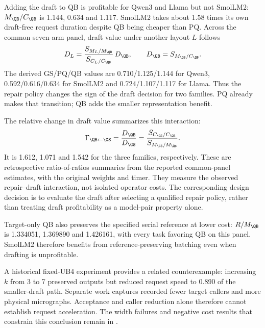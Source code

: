Adding the draft to QB is profitable for Qwen3 and Llama but not SmolLM2: $M_{\QB}/C_{\QB}$ is 1.144, 0.634 and 1.117. SmolLM2 takes about 1.58 times its own draft-free request duration despite QB being cheaper than PQ. Across the common seven-arm panel, draft value under another layout $L$ follows
\begin{equation}
D_L=\frac{S_{M_L/M_{\QB}}}{S_{C_L/C_{\QB}}}\,D_{\QB},\qquad D_{\QB}=S_{M_{\QB}/C_{\QB}}.
\label{eq:draft}
\end{equation}
The derived GS/PQ/QB values are 0.710/1.125/1.144 for Qwen3, 0.592/0.616/0.634 for SmolLM2 and 0.724/1.107/1.117 for Llama. Thus the repair policy changes the sign of the draft decision for two families. PQ already makes that transition; QB adds the smaller representation benefit.

The relative change in draft value summarizes this interaction:
\begin{equation}
\Gamma_{\QB\leftarrow\GS}=\frac{D_{\QB}}{D_{\GS}}
=\frac{S_{C_{\GS}/C_{\QB}}}{S_{M_{\GS}/M_{\QB}}}.
\label{eq:repairinteraction}
\end{equation}
It is 1.612, 1.071 and 1.542 for the three families, respectively. These are retrospective ratio-of-ratios summaries from the reported common-panel estimates, with the original weights and timer. They measure the observed repair--draft interaction, not isolated operator costs. The corresponding design decision is to evaluate the draft after selecting a qualified repair policy, rather than treating draft profitability as a model-pair property alone.

Target-only QB also preserves the specified serial reference at lower cost: $R/M_{\QB}$ is 1.334051, 1.369890 and 1.426161, with every task favoring QB on this panel. SmolLM2 therefore benefits from reference-preserving batching even when drafting is unprofitable.

A historical fixed-UB4 experiment provides a related counterexample: increasing $k$ from 3 to 7 preserved outputs but reduced request speed to 0.890 of the smaller-draft path. Separate work captures recorded fewer target callers and more physical micrographs. Acceptance and caller reduction alone therefore cannot establish request acceleration. The width failures and negative cost results that constrain this conclusion remain in .
